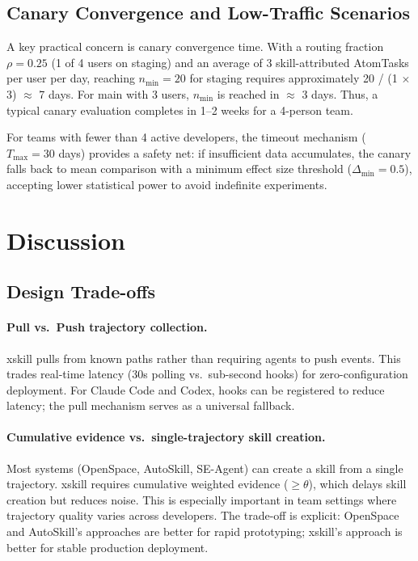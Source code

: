 \documentclass{article}
\begin{document}
\subsection{Canary Convergence and Low-Traffic Scenarios}

A key practical concern is canary convergence time. With a routing fraction $\rho = 0.25$ (1 of 4 users on staging) and an average of 3 skill-attributed AtomTasks per user per day, reaching $n_{\min} = 20$ for staging requires approximately 20 / (1 $\times$ 3) $\approx$ 7 days. For main with 3 users, $n_{\min}$ is reached in $\approx$ 3 days. Thus, a typical canary evaluation completes in 1--2 weeks for a 4-person team.

For teams with fewer than 4 active developers, the timeout mechanism ($T_{\max} = 30$ days) provides a safety net: if insufficient data accumulates, the canary falls back to mean comparison with a minimum effect size threshold ($\Delta_{\min} = 0.5$), accepting lower statistical power to avoid indefinite experiments.


\section{Discussion}
\label{sec:discussion}

\subsection{Design Trade-offs}

\paragraph{Pull vs.\ Push trajectory collection.} xskill pulls from known paths rather than requiring agents to push events. This trades real-time latency (30s polling vs.\ sub-second hooks) for zero-configuration deployment. For Claude Code and Codex, hooks can be registered to reduce latency; the pull mechanism serves as a universal fallback.

\paragraph{Cumulative evidence vs.\ single-trajectory skill creation.} Most systems (OpenSpace, AutoSkill, SE-Agent) can create a skill from a single trajectory. xskill requires cumulative weighted evidence ($\geq\theta$), which delays skill creation but reduces noise. This is especially important in team settings where trajectory quality varies across developers. The trade-off is explicit: OpenSpace and AutoSkill's approaches are better for rapid prototyping; xskill's approach is better for stable production deployment.
\end{document}

